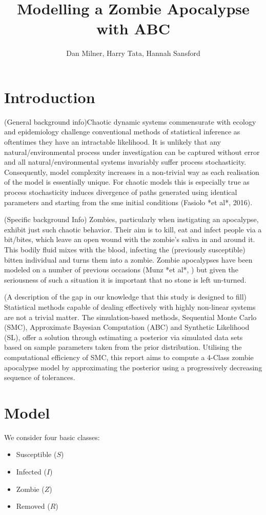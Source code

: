 \documentclass[]{article}
\title{Modelling a Zombie Apocalypse with ABC}
\author{Dan Milner, Harry Tata, Hannah Sansford}
\begin{document}
\maketitle

\section{Introduction}

(General background info)Chaotic dynamic systems commensurate with ecology and epidemiology challenge conventional methods of statistical inference as oftentimes they have an intractable likelihood. It is unlikely that any natural/environmental process under investigation can be captured without error and all natural/environmental systems invariably suffer process stochasticity. Consequently, model complexity increases in a non-trivial way as each realisation of the model is essentially unique. For chaotic models this is especially true as process stochasticity induces divergence of paths generated using identical parameters and starting from the sme initial conditions (Fasiolo *et al*, 2016).

(Specific background Info) Zombies, particularly when instigating an apocalypse, exhibit just such chaotic behavior. Their aim is to kill, eat and infect people via a bit/bites, which leave an open wound with the zombie's saliva in and around it. This bodily fluid mixes with the blood, infecting the (previously susceptible) bitten individual and turns them into a zombie. Zombie apocalypses have been modeled on a number of previous occasions (Munz *et al*, ) but given the seriousness of such a situation it is important that no stone is left un-turned. 

(A description of the gap in our knowledge that this study is designed to fill) Statistical methods capable of dealing effectively with highly non-linear systems are not a trivial matter. The simulation-based methods, Sequential Monte Carlo (SMC), Approximate Bayesian Computation (ABC) and Synthetic Likelihood (SL), offer a solution through estimating a posterior via simulated data sets based on sample parameters taken from the prior distribution. Utilising the computational efficiency of SMC, this report aims to compute a 4-Class zombie apocalypse model by approximating the posterior using a progressively decreasing sequence of tolerances. 


\section{Model}
We consider four basic classes:
\begin{itemize}
	\item Susceptible ($S$)
	\item Infected ($I$)
	\item Zombie ($Z$)
	\item Removed ($R$)
\end{itemize}
\end{document}
